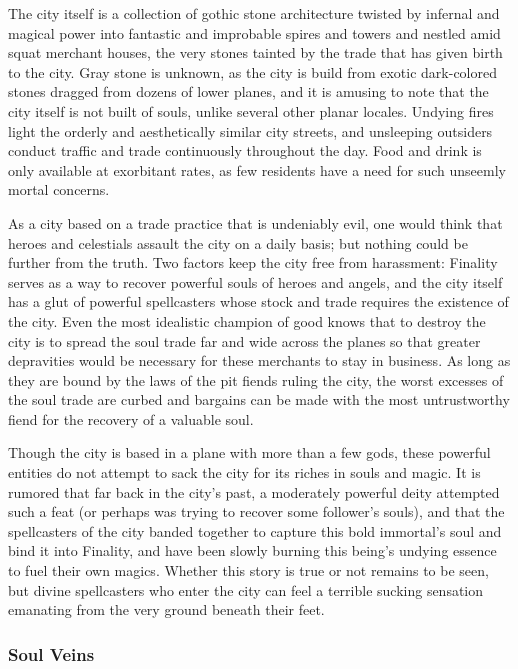 The city itself is a collection of gothic stone architecture twisted by infernal and magical power into fantastic and improbable spires and towers and nestled amid squat merchant houses, the very stones tainted by the trade that has given birth to the city. Gray stone is unknown, as the city is build from exotic dark-colored stones dragged from dozens of lower planes, and it is amusing to note that the city itself is not built of souls, unlike several other planar locales. Undying fires light the orderly and aesthetically similar city streets, and unsleeping outsiders conduct traffic and trade continuously throughout the day. Food and drink is only available at exorbitant rates, as few residents have a need for such unseemly mortal concerns.

As a city based on a trade practice that is undeniably evil, one would think that heroes and celestials assault the city on a daily basis; but nothing could be further from the truth. Two factors keep the city free from harassment: Finality serves as a way to recover powerful souls of heroes and angels, and the city itself has a glut of powerful spellcasters whose stock and trade requires the existence of the city. Even the most idealistic champion of good knows that to destroy the city is to spread the soul trade far and wide across the planes so that greater depravities would be necessary for these merchants to stay in business. As long as they are bound by the laws of the pit fiends ruling the city, the worst excesses of the soul trade are curbed and bargains can be made with the most untrustworthy fiend for the recovery of a valuable soul.

Though the city is based in a plane with more than a few gods, these powerful entities do not attempt to sack the city for its riches in souls and magic. It is rumored that far back in the city's past, a moderately powerful deity attempted such a feat (or perhaps was trying to recover some follower's souls), and that the spellcasters of the city banded together to capture this bold immortal's soul and bind it into Finality, and have been slowly burning this being's undying essence to fuel their own magics. Whether this story is true or not remains to be seen, but divine spellcasters who enter the city can feel a terrible sucking sensation emanating from the very ground beneath their feet.

\subsubsection{Soul Veins}

